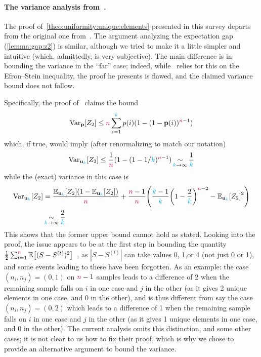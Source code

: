 \paragraph{The variance analysis from~\citet{Paninski08}.}
The proof of~\cref{theo:uniformity:unique:elements} presented in this survey departs from the original one from~\citet{Paninski08}. The argument analyzing the expectation gap (\cref{lemma:gap:z2}) is similar, although we tried to make it a little simpler and intuitive (which, admittedly, is very subjective). The main difference is in bounding the variance in the ``far'' case; indeed, while~\cite{Paninski08} relies for this on the Efron--Stein inequality, the proof he presents is flawed, and the claimed variance bound does not follow.

Specifically, the proof of~\citet[Lemma~2]{Paninski08} claims the bound
\[
  \operatorname{Var}_{\mathbf{p}}[Z_2] \leq {\textcolor{purple}{n}} \sum_{i=1}^{\textcolor{cyan}{k}} p(i)(1-(1-\mathbf{p}(i))^{{\textcolor{purple}{n}}-1})
\]
which, if true, would imply (after renormalizing to match our notation)
\[
  \operatorname{Var}_{\mathbf{u}_{\textcolor{cyan}{k}}}[Z_2] \leq \frac{1}{{\textcolor{purple}{n}}}(1-(1-1/{\textcolor{cyan}{k}})^{{\textcolor{purple}{n}}-1}) \operatorname*{\sim}_{{\textcolor{cyan}{k}}\to \infty} \frac{1}{{\textcolor{cyan}{k}}}
\]
while the (exact) variance in this case is
\begin{align*}
\Var_{\uniform_\ab}[Z_2]
&= \frac{\bE{\uniform_\ab}{Z_2}(1-\bE{\uniform_\ab}{Z_2})}{\ns} + \frac{\ns-1}{\ns}\Paren{ \frac{\ab-1}{\ab}\Paren{1-\frac{2}{\ab}}^{\ns-2} - \bE{\uniform_\ab}{Z_2}^2} \\
&\operatorname*{\sim}_{\ab\to \infty} \frac{2}{\ab}
\end{align*}
This shows that the former upper bound cannot hold as stated. Looking into the proof, the issue appears to be at the first step in bounding 
the quantity $\frac{1}{2} \sum_{t=1}^\ns \bEE{(S-S^{(t)})^2}$~\cite[p.3, top of right column]{Paninski08}, as $|S-S^{(i)}|$ can take values 0, 1,or 4 (not just 0 or 1), and some events leading to these have been forgotten. As an example: the case $(n_i,n_j)=(0,1)$ on ${\textcolor{purple}{n}}-1$ samples leads to a difference of 2 when the remaining sample falls on $i$ in one case and $j$ in the other (as it gives 2 unique elements in one case, and 0 in the other), and is thus different from say the case $(n_i,n_j)=(0,2)$ which leads to a difference of 1 when the remaining sample falls on $i$ in one case and $j$ in the other (as it gives 1 unique elements in one case, and 0 in the other). The current analysis omits this distinction, and some other cases; it is not clear to us how to fix their proof, which is why we chose to provide an alternative argument to bound the variance.

